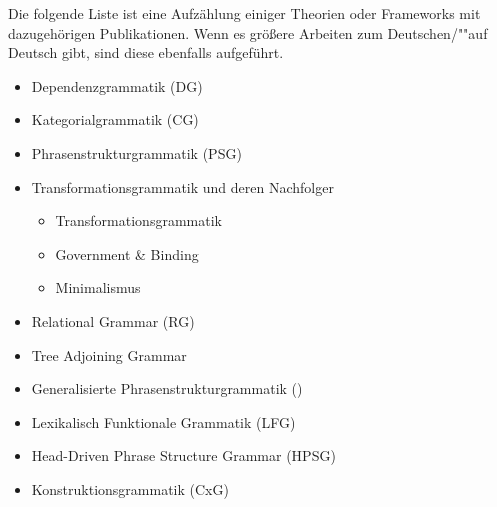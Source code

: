 Die folgende Liste ist eine Aufzählung einiger Theorien oder Frameworks mit dazugehörigen
Publikationen. Wenn es größere Arbeiten zum Deutschen/""auf Deutsch gibt, sind diese ebenfalls
aufgeführt.
\begin{itemize}
\item Dependenzgrammatik (DG)\\\citep{Tesniere59a-u,Tesniere2015a-u,Kunze75a-u,Hudson90a-u,Weber92a,Heringer96a-u}\nocite{Tesniere80a-u}
\item Kategorialgrammatik (CG)\\
\citep*{Ajdukiewicz35a-u,Montague74b-u,Dowty79a,BFZ97a,Steedman2000a-u}
\item Phrasenstrukturgrammatik (PSG)\nocite{Bloomfield33a-u}\\
      \citep*{BHPS61a} %
\item Transformationsgrammatik und deren Nachfolger
      \begin{itemize}
      \item Transformationsgrammatik\\\citep{Chomsky57a,Bierwisch63a}
      \item Government \& Binding\\\citep{Chomsky81a,SS88a,Grewendorf88a}
      \item Minimalismus\\\citep{Chomsky95a-u,Grewendorf2002a}
      \end{itemize}
\item Relational Grammar (RG)\\
      \citep{Perlmutter83a-ed}
\item Tree Adjoining Grammar\\
      \citep*{JLT75a-u,Joshi87a-u,JS97a}      
\item Generalisierte Phrasenstrukturgrammatik (\gpsg)\\
      \citep*{GKPS85a}
\item Lexikalisch Funktionale Grammatik (LFG)\\
      \citep{Bresnan82a-ed,Bresnan2001a,BF96a-ed,Berman2003a}
\item Head-Driven Phrase Structure Grammar (HPSG)\\\citep*{ps,ps2,Kiss95b,Sag97a,Mueller99a,Mueller2002b,HPSGHandbook}
\item Konstruktionsgrammatik (CxG)\\\citep*{FKoC88a,KF99a,Goldberg95a,FS2006a-ed}
\end{itemize}

